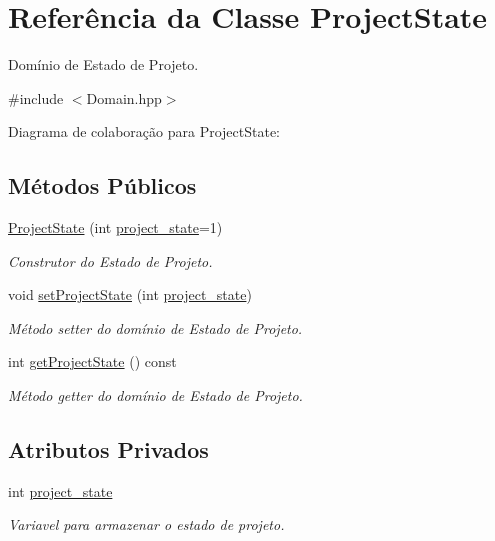\hypertarget{classProjectState}{}\section{Referência da Classe Project\+State}
\label{classProjectState}


Domínio de Estado de Projeto.  




{\ttfamily \#include $<$Domain.\+hpp$>$}



Diagrama de colaboração para Project\+State\+:
\subsection*{Métodos Públicos}
\begin{DoxyCompactItemize}
\item 
\hyperlink{classProjectState_a61af7f1893ff51ef66c4aeb46585db8e}{Project\+State} (int \hyperlink{classProjectState_ae498c9ef4da8937df35a12379ee1486a}{project\+\_\+state}=1)
\begin{DoxyCompactList}\small\item\em Construtor do Estado de Projeto. \end{DoxyCompactList}\item 
void \hyperlink{classProjectState_a04b2df31e839624a758dd39f18dd522c}{set\+Project\+State} (int \hyperlink{classProjectState_ae498c9ef4da8937df35a12379ee1486a}{project\+\_\+state})
\begin{DoxyCompactList}\small\item\em Método setter do domínio de Estado de Projeto. \end{DoxyCompactList}\item 
int \hyperlink{classProjectState_a27bad04e4d2c7becc39daf276c1841a1}{get\+Project\+State} () const 
\begin{DoxyCompactList}\small\item\em Método getter do domínio de Estado de Projeto. \end{DoxyCompactList}\end{DoxyCompactItemize}
\subsection*{Atributos Privados}
\begin{DoxyCompactItemize}
\item 
int \hyperlink{classProjectState_ae498c9ef4da8937df35a12379ee1486a}{project\+\_\+state}\hypertarget{classProjectState_ae498c9ef4da8937df35a12379ee1486a}{}\label{classProjectState_ae498c9ef4da8937df35a12379ee1486a}

\begin{DoxyCompactList}\small\item\em Variavel para armazenar o estado de projeto. \end{DoxyCompactList}\end{DoxyCompactItemize}


